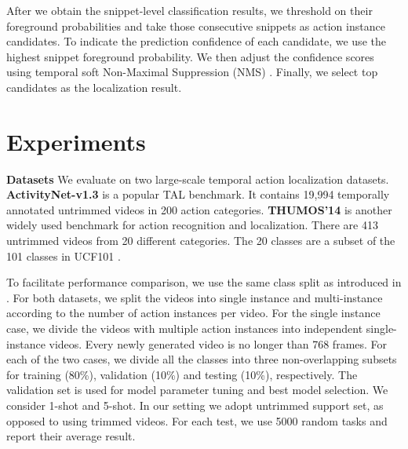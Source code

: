 \documentclass{bmvc2k}
\begin{document}
After we obtain the snippet-level classification results,
we threshold on their {foreground probabilities}
and take those consecutive snippets as action instance candidates. 
To indicate the prediction confidence of each candidate,
we use the highest snippet foreground probability.
We then adjust the confidence scores using temporal soft Non-Maximal Suppression (NMS) \cite{bodla2017soft,lin2019bmn}. Finally, we select top  candidates as the localization result.
\vspace{-0.3in}
\section{Experiments}
\label{sec:experiments}

{\bf Datasets}
We evaluate on two large-scale temporal action localization datasets. \textbf{ActivityNet-v1.3} \cite{caba2015activitynet} is a popular TAL benchmark.
It contains 19,994 temporally annotated untrimmed videos in 200 action categories. \textbf{THUMOS'14} \cite{jiang2014thumos} is another
widely used benchmark for action recognition and localization. There are 413 untrimmed videos from 20 different categories. 
The 20 classes are a subset of the 101 classes in UCF101 \cite{soomro2012ucf101}. 






To facilitate performance comparison, we use the same class split as introduced in  \cite{yang2020localizing}.
For both datasets, we split the videos into single instance and multi-instance according to the number of action instances per video. 
For the single instance case, we divide the videos with multiple action instances into independent single-instance videos. Every newly generated video is no longer than 768 frames. 
For each of the two cases, we divide all the classes into three non-overlapping subsets for training (80\%), validation (10\%) and testing (10\%), respectively. The validation set is used for model parameter tuning and 
best model selection. We consider 1-shot and 5-shot.
In our setting we adopt untrimmed support set, 
as opposed to \cite{yang2020localizing} using trimmed videos. For each test, we use 5000 random tasks and report their average result.
\end{document}
